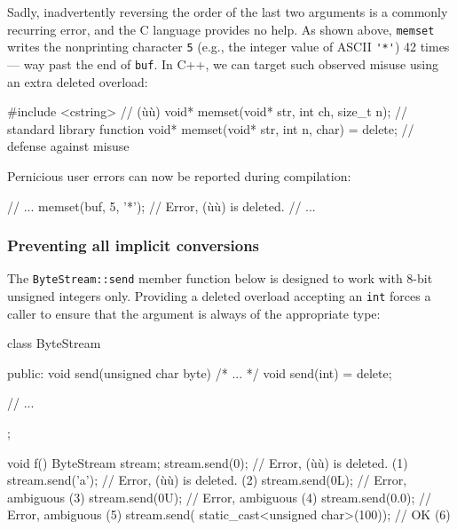 \noindent Sadly, inadvertently reversing the order of the last two arguments is a commonly
recurring error, and the C language provides no help. As shown above, \lstinline!memset! writes the nonprinting character \lstinline!5! (e.g., the integer value of ASCII \lstinline!'*'!) 42 times --- way past the end of \lstinline!buf!. In C++, we
can target such observed misuse using an extra deleted overload:

\begin{emcppslisting}
#include <cstring>  // (ù{}ù)
void* memset(void* str, int ch, size_t n);      // standard library function
void* memset(void* str, int n, char) = delete;  // defense against misuse
\end{emcppslisting}

\noindent Pernicious user errors can now be reported during compilation:

\begin{emcppslisting}
// ...
memset(buf, 5, '*');  // Error, (ù{}ù) is deleted.
// ...
\end{emcppslisting}


\subsubsection[Preventing all implicit conversions]{Preventing all implicit conversions}\label{preventing-all-implicit-conversions}

The \lstinline!ByteStream::send! member function below is designed to work
with 8-bit unsigned integers only. Providing a deleted overload
accepting an \lstinline!int! forces a caller to ensure that the argument is
always of the appropriate type:

\begin{emcppslisting}
class ByteStream
{
public:
    void send(unsigned char byte) { /* ... */ }
    void send(int) = delete;

    // ...
};

void f()
{
    ByteStream stream;
    stream.send(0);   // Error, (ù{}ù) is deleted.     (1)
    stream.send('a'); // Error, (ù{}ù) is deleted.     (2)
    stream.send(0L);  // Error, ambiguous                 (3)
    stream.send(0U);  // Error, ambiguous                 (4)
    stream.send(0.0); // Error, ambiguous                 (5)
    stream.send(
        static_cast<unsigned char>(100));  // OK          (6)
}
\end{emcppslisting}

